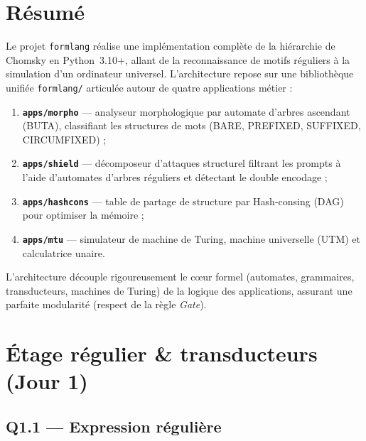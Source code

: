 \documentclass[12pt,a4paper,oneside]{scrartcl}
\begin{document}
\section{Résumé}

Le projet \texttt{formlang} réalise une implémentation complète de la hiérarchie de Chomsky en Python~3.10+, allant de la reconnaissance de motifs réguliers à la simulation d'un ordinateur universel. L'architecture repose sur une bibliothèque unifiée \texttt{formlang/} articulée autour de quatre applications métier :

\begin{enumerate}[leftmargin=2cm]
    \item \textbf{\texttt{apps/morpho}} — analyseur morphologique par automate d'arbres ascendant (BUTA), classifiant les structures de mots (BARE, PREFIXED, SUFFIXED, CIRCUMFIXED) ;
    \item \textbf{\texttt{apps/shield}} — décomposeur d'attaques structurel filtrant les prompts à l'aide d'automates d'arbres réguliers et détectant le double encodage ;
    \item \textbf{\texttt{apps/hashcons}} — table de partage de structure par Hash-consing (DAG) pour optimiser la mémoire ;
    \item \textbf{\texttt{apps/mtu}} — simulateur de machine de Turing, machine universelle (UTM) et calculatrice unaire.
\end{enumerate}

L'architecture découple rigoureusement le cœur formel (automates, grammaires, transducteurs, machines de Turing) de la logique des applications, assurant une parfaite modularité (respect de la règle \textit{Gate}).

\begin{center}
\end{center}

\newpage

\section{Étage régulier \& transducteurs (Jour 1)}

\subsection{Q1.1 — Expression régulière}
\end{document}
